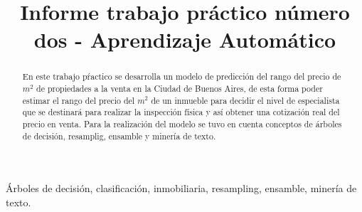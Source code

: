 \documentclass[11pt,conference]{IEEEtran}
\begin{document}
\pagestyle{empty}  


\title{Informe trabajo práctico número dos - Aprendizaje Automático}

\author{
\and
{}
}

\maketitle

\begin{abstract}

En este trabajo pŕactico se desarrolla un modelo de predicción del rango del precio de $m^2$ de propiedades
a la venta en la Ciudad de Buenos Aires, de esta forma poder estimar el rango del precio del $m^2$ de un inmueble para
decidir el nivel de especialista que se destinará para realizar la inspección física y así obtener una cotización real
del precio en venta. Para la realización del modelo se tuvo en cuenta conceptos de árboles de decisión, resamplig,
ensamble y minería de texto.

\end{abstract}
 


\begin{IEEEkeywords}
Árboles de decisión, clasificación, inmobiliaria, resampling, ensamble, minería de texto.
\end{IEEEkeywords}

\thispagestyle{empty} 

\IEEEpeerreviewmaketitle










\ifCLASSOPTIONcaptionsoff
  \newpage
\fi





\end{document}
